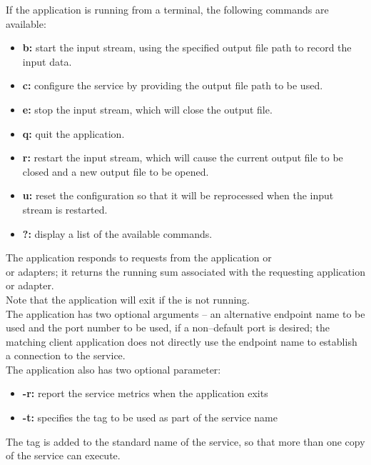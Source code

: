 If the application is running from a terminal, the following commands are available:
\begin{itemize}
\item \textbf{b:} start the input stream, using the specified output file path to record
the input data. 
\item \textbf{c:} configure the service by providing the output file path to be used. 
\item \textbf{e:} stop the input stream, which will close the output file. 
\item \textbf{q:} quit the application. 
\item \textbf{r:} restart the input stream, which will cause the current output file to be
closed and a new output file to be opened.
\item \textbf{u:} reset the configuration so that it will be reprocessed when the input
stream is restarted. 
\item \textbf{?:} display a list of the available commands.
\end{itemize}
The  application responds to
requests from the  application or\\
 or
 adapters; it returns the running sum
associated with the requesting application or adapter.\\

Note that the application will exit if the
 is not running.\\

The application has two optional arguments -- an alternative endpoint name to be used and
the port number to be used, if a non--default port is desired; the matching client
application does not directly use the endpoint name to establish a connection to the
service.\\

The application also has two optional parameter:
\begin{itemize}
\item \textbf{-r:} report the service metrics when the application exits
\item \textbf{-t:} specifies the tag to be used as part of the service name
\end{itemize}
The tag is added to the standard name of the service, so that more than one copy of the
service can execute.\\

